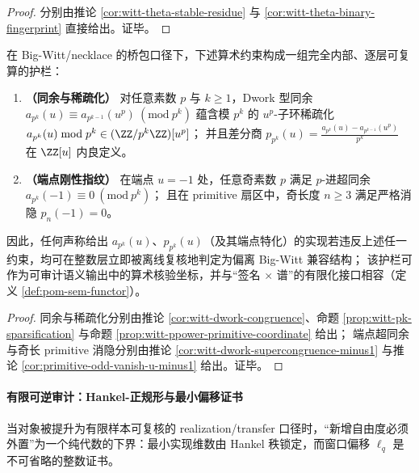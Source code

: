 \begin{proof}
分别由推论 \ref{cor:witt-theta-stable-residue} 与 \ref{cor:witt-theta-binary-fingerprint} 直接给出。证毕。
\end{proof}

\begin{proposition}\label{prop:dephys-padic-guardrails-endpoint-rigidity}
在 Big-Witt/necklace 的桥包口径下，下述算术约束构成一组完全内部、逐层可复算的护栏：
\begin{enumerate}
  \item \textbf{（同余与稀疏化）}
  对任意素数 \(p\) 与 \(k\ge 1\)，Dwork 型同余
  \(
  a_{p^k}(u)\equiv a_{p^{k-1}}(u^p)\ (\mathrm{mod}\ p^k)
  \)
  蕴含模 \(p^k\) 的 \(u^p\)-子环稀疏化
  \(
  a_{p^k}(u)\bmod p^k\in(\ZZ/p^k\ZZ)[u^p]
  \)；
  并且差分商
  \(
  p_{p^k}(u)=\frac{a_{p^k}(u)-a_{p^{k-1}}(u^p)}{p^k}
  \)
  在 \(\ZZ[u]\) 内良定义。
  \item \textbf{（端点刚性指纹）}
  在端点 \(u=-1\) 处，任意奇素数 \(p\) 满足 \(p\)-进超同余
  \(
  a_{p^k}(-1)\equiv 0\ (\mathrm{mod}\ p^k)
  \)；
  且在 primitive 扇区中，奇长度 \(n\ge 3\) 满足严格消隐 \(p_n(-1)=0\)。
\end{enumerate}
因此，任何声称给出 \(a_{p^k}(u)\)、\(p_{p^k}(u)\)（及其端点特化）的实现若违反上述任一约束，均可在整数层立即被离线复核地判定为偏离 Big-Witt 兼容结构；
该护栏可作为可审计语义输出中的算术核验坐标，并与“签名 \(\times\) 谱”的有限化接口相容（定义 \ref{def:pom-sem-functor}）。
\end{proposition}

\begin{proof}
同余与稀疏化分别由推论 \ref{cor:witt-dwork-congruence}、命题 \ref{prop:witt-pk-sparsification} 与命题 \ref{prop:witt-ppower-primitive-coordinate} 给出；
端点超同余与奇长 primitive 消隐分别由推论 \ref{cor:witt-dwork-supercongruence-minus1} 与推论 \ref{cor:primitive-odd-vanish-u-minus1} 给出。证毕。
\end{proof}

\paragraph{有限可逆审计：Hankel-正规形与最小偏移证书}
当对象被提升为有限样本可复核的 realization/transfer 口径时，“新增自由度必须外置”为一个纯代数的下界：最小实现维数由 Hankel 秩锁定，而窗口偏移 \(\ell_q\) 是不可省略的整数证书。

